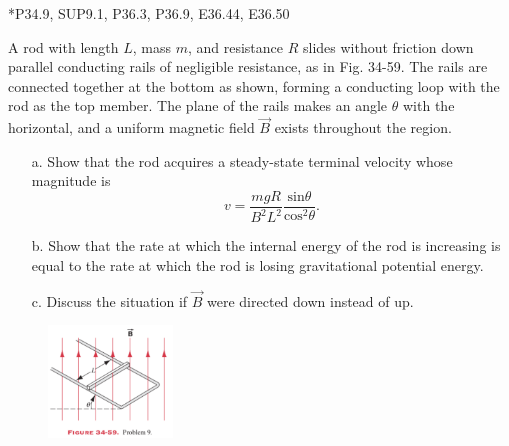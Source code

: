 \documentclass[11pt,letterpaper,boxed]{pset}
\begin{document}
    \begin{center}
        *P34.9, SUP9.1, P36.3, P36.9, E36.44, E36.50
    \end{center}
    
    \begin{problem} [*P34.9]
        A rod with length $L$, mass $m$, and resistance $R$ slides without friction down parallel conducting rails of negligible resistance, as in Fig. 34-59. The rails are connected together at the bottom as shown, forming a conducting loop with the rod as the top member. The plane of the rails makes an angle $\theta$ with the horizontal, and a uniform magnetic field $\Vec{B}$ exists throughout the region. 
        
        \begin{enumerate}
            \item [a.] Show that the rod acquires a steady-state terminal velocity whose magnitude is
            \[v = \frac{mgR}{B^2L^2}\frac{\text{sin} \theta}{\text{cos}^2 \theta}.\]
            \item [b.] Show that the rate at which the internal energy of the rod is increasing is equal to the rate at which the rod is losing gravitational potential energy.
            \item [c.] Discuss the situation if $\Vec{B}$ were directed down instead of up.
        \end{enumerate}
    \end{problem}
    
    \begin{figure} [ht]
        \includegraphics[width=125px]{HW9Images/P34-9.png}
        \label{fig:P34-9}
    \end{figure}
    \newpage
    
\end{document}
